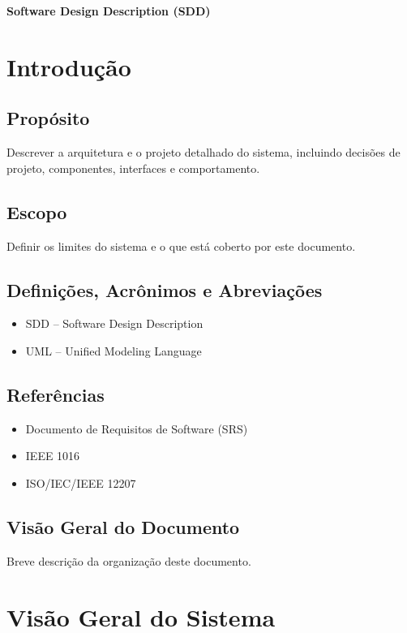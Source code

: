 \begin{center}
    \textbf{\Huge{Software Design Description (SDD)}}
\end{center}

\section{Introdução}

\subsection{Propósito}
Descrever a arquitetura e o projeto detalhado do sistema, incluindo decisões de projeto, componentes, interfaces e comportamento.

\subsection{Escopo}
Definir os limites do sistema e o que está coberto por este documento.

\subsection{Definições, Acrônimos e Abreviações}
\begin{itemize}
    \item SDD -- Software Design Description
    \item UML -- Unified Modeling Language
\end{itemize}

\subsection{Referências}
\begin{itemize}
    \item Documento de Requisitos de Software (SRS)
    \item IEEE 1016
    \item ISO/IEC/IEEE 12207
\end{itemize}

\subsection{Visão Geral do Documento}
Breve descrição da organização deste documento.

\newpage

\section{Visão Geral do Sistema}

